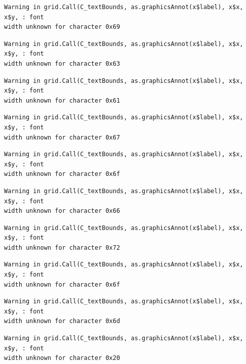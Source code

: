 \documentclass[
  letterpaper,
  DIV=11,
  numbers=noendperiod]{scrreprt}
\begin{document}
\begin{verbatim}
Warning in grid.Call(C_textBounds, as.graphicsAnnot(x$label), x$x, x$y, : font
width unknown for character 0x69
\end{verbatim}

\begin{verbatim}
Warning in grid.Call(C_textBounds, as.graphicsAnnot(x$label), x$x, x$y, : font
width unknown for character 0x63
\end{verbatim}

\begin{verbatim}
Warning in grid.Call(C_textBounds, as.graphicsAnnot(x$label), x$x, x$y, : font
width unknown for character 0x61
\end{verbatim}

\begin{verbatim}
Warning in grid.Call(C_textBounds, as.graphicsAnnot(x$label), x$x, x$y, : font
width unknown for character 0x67
\end{verbatim}

\begin{verbatim}
Warning in grid.Call(C_textBounds, as.graphicsAnnot(x$label), x$x, x$y, : font
width unknown for character 0x6f
\end{verbatim}

\begin{verbatim}
Warning in grid.Call(C_textBounds, as.graphicsAnnot(x$label), x$x, x$y, : font
width unknown for character 0x66
\end{verbatim}

\begin{verbatim}
Warning in grid.Call(C_textBounds, as.graphicsAnnot(x$label), x$x, x$y, : font
width unknown for character 0x72
\end{verbatim}

\begin{verbatim}
Warning in grid.Call(C_textBounds, as.graphicsAnnot(x$label), x$x, x$y, : font
width unknown for character 0x6f
\end{verbatim}

\begin{verbatim}
Warning in grid.Call(C_textBounds, as.graphicsAnnot(x$label), x$x, x$y, : font
width unknown for character 0x6d
\end{verbatim}

\begin{verbatim}
Warning in grid.Call(C_textBounds, as.graphicsAnnot(x$label), x$x, x$y, : font
width unknown for character 0x20
\end{verbatim}
\end{document}
